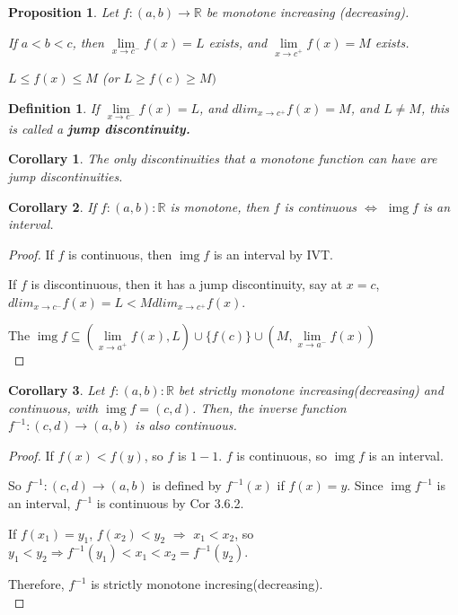 \documentclass[12pt]{article}
\theoremstyle{plain}
\newtheorem{definition}{Definition}[subsection]
\newtheorem{proposition}{Proposition}[subsection]
\newtheorem{corollary}{Corollary}[subsection]
\newcommand{\dlim}{\displaystyle\lim\limits}
\DeclareMathOperator{\Img}{img}
\begin{document}
    \begin{proposition}
        Let $f:(a,b)\to\mathbb{R}$ be monotone increasing (decreasing). 
        
        If $a<b<c$, then $\dlim_{x\to c^-}f(x) =L$ exists, 
        and $\dlim_{x\to c^+}f(x) =M$ exists.
        
        $L \leq f(x) \leq M$ (or $L\geq f(c)\geq M)$\\
    \end{proposition}

    \begin{definition}
        If $\dlim_{x\to c^-}f(x) =L$, and $dlim_{x\to c^+}f(x) =M$,
        and $L\neq M$, this is called a \textbf{jump discontinuity.}\\
    \end{definition}

    \begin{corollary}
        The only discontinuities that a monotone function can have
        are jump discontinuities.\\
    \end{corollary}
 
    \begin{corollary}
        If $f:(a,b) : \mathbb{R}$ is monotone, then $f$ is continuous
        $\Leftrightarrow$ $\Img f$ is an interval.
    \end{corollary}
    \begin{proof}
        If $f$ is continuous, then $\Img f$ is an interval by 
        IVT. 

        If $f$ is discontinuous, then it has a jump discontinuity,
        say at $x=c$, $dlim_{x\to c^-}f(x) =L<Mdlim_{x\to c^+}f(x)$.
        
        The $\Img f \subseteq (\dlim_{x\to a^+} f(x), L)
        \cup \{f(c)\}\cup(M,\dlim_{x\to a^-} f(x))$\\ 
    \end{proof}

    \begin{corollary}
        Let $f:(a,b) : \mathbb{R}$ bet strictly monotone increasing(decreasing)
        and continuous,
        with $\Img f = (c , d)$. 
        Then, the inverse function $f^{-1}:(c,d) \to (a,b)$ is also continuous.
    \end{corollary}

    \begin{proof}
        If $f(x)<f(y)$, so $f$ is $1-1$. $f$ is continuous, 
        so $\Img f$ is an interval.

        So $f^{-1}:(c, d)\to (a,b)$ is defined by $f^{-1} (x)$ if $f(x) = y$.
        Since $\Img f^{-1}$ is an interval, $f^{-1}$ is continuous by Cor 3.6.2.

        If $f(x_1) = y_1$, $f(x_2) < y_2$ $\Rightarrow$ $x_1<x_2$,        
        so $y_1<y_2 \Rightarrow f^{-1}(y_1)<x_1<x_2=f^{-1}(y_2)$.
        
        Therefore, $f^{-1}$ is strictly monotone incresing(decreasing).\\
    \end{proof} 
\end{document}
